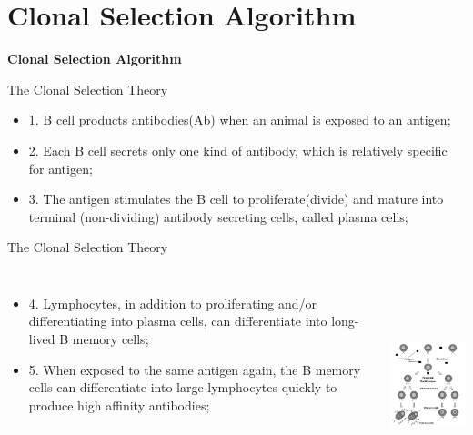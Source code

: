 \section{Clonal Selection Algorithm}

\begin{frame}
\centering
\Huge \textbf{Clonal Selection Algorithm} 
\\
\large {}
\end{frame}

\begin{frame}{The Clonal Selection Theory}
\begin{itemize}
\item{1. B cell products antibodies(Ab) when an animal is exposed to an antigen;}
\item{2. Each B cell secrets only one kind of antibody, which is relatively specific for antigen;}
\item{3. The antigen stimulates the B cell to proliferate(divide) and mature into terminal (non-dividing) antibody secreting cells, called plasma cells;}
\end{itemize}
\end{frame}


\begin{frame}{The Clonal Selection Theory}
\begin{columns}[c] 
\begin{itemize}
\item{4. Lymphocytes, in addition to proliferating and/or differentiating into plasma cells, can differentiate into long-lived B  memory cells;}
\item{5. When exposed to the same antigen again, the B memory cells can differentiate into large lymphocytes quickly to produce high affinity antibodies;}
\end{itemize}
\includegraphics[height=6cm]{img/cj_clone_selection_p.png}
\end{columns}
\end{frame}

